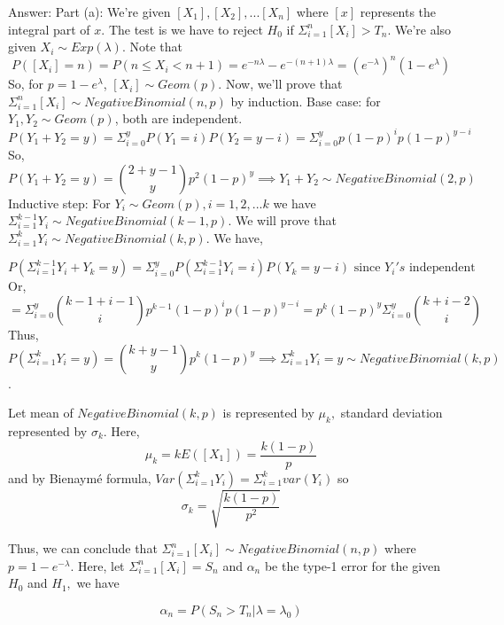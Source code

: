\documentclass[12pt, oneside]{article}
\begin{document}
\begin{enumerate}
Answer:
\newline Part (a): We're given $[X_1],[X_2],...[X_n]$ where $[x]$ represents the integral part of $x$. The test is we have to reject $H_0$ if $\Sigma_{i=1}^{n} [X_i] > T_n$. 
\newline We're also given $X_i \sim Exp(\lambda)$. Note that $$P([X_i] = n) = P(n \le X_i < n+1) = e^{-n\lambda} - e^{-(n+1)\lambda} = (e^{-\lambda})^n (1-e^{\lambda})$$
So, for $p = 1 - e^{\lambda}$, $[X_i] \sim Geom(p)$. Now, we'll prove that $\Sigma_{i=1}^{n} [X_i] \sim NegativeBinomial(n,p)$ by induction.
\newline Base case: for $Y_1,Y_2 \sim Geom(p)$, both are independent. 
$$P(Y_1 + Y_2 = y) = \Sigma_{i=0}^{y} P(Y_1 = i) P(Y_2 = y-i) = \Sigma_{i=0}^{y} p(1-p)^i p (1-p)^{y-i}$$
So, 
$$P(Y_1 + Y_2 = y) = {2+y-1 \choose y} p^2 (1-p)^{y} \implies Y_1 + Y_2 \sim NegativeBinomial(2,p)$$
\newline Inductive step: For $Y_i \sim Geom(p), i=1,2,...k$ we have $\Sigma_{i=1}^{k-1} Y_i \sim NegativeBinomial(k-1,p)$. We will prove that $\Sigma_{i=1}^{k} Y_i \sim NegativeBinomial(k,p)$. We have,

$$P(\Sigma_{i=1}^{k-1} Y_i + Y_{k} = y) = \Sigma_{i=0}^{y} P(\Sigma_{i=1}^{k-1} Y_i = i) P(Y_k = y-i) \text{   since $Y_i's$ independent}$$
Or,
$$ = \Sigma_{i=0}^{y} {k-1+i-1 \choose i} p^{k-1} (1-p)^i p (1-p)^{y-i} = p^k (1-p)^y \Sigma_{i=0}^{y} {k+i-2 \choose i}$$
Thus,
$$P(\Sigma_{i=1}^{k} Y_i = y) = {k+y-1 \choose y} p^k (1-p)^y \implies \Sigma_{i=1}^{k} Y_i = y \sim NegativeBinomial(k,p)$$. 

Let mean of $NegativeBinomial(k,p)$ is represented by $\mu_k,$ standard deviation represented by $\sigma_k$. Here,
$$\mu_k = k E([X_1]) = \dfrac{k(1-p)}{p}$$ and by Bienaymé formula, 
$Var(\Sigma_{i=1}^{k} Y_i) = \Sigma_{i=1}^{k} var(Y_i)$ so
$$\sigma_k = \sqrt{\dfrac{k(1-p)}{p^2}}$$
 
Thus, we can conclude that $\Sigma_{i=1}^{n} [X_i] \sim NegativeBinomial(n,p)$ where $p = 1 - e^{-\lambda}$. Here, let $\Sigma_{i=1}^{n} [X_i] = S_n$ and $\alpha_n$ be the type-1 error for the given $H_0$ and $H_1,$ we have

$$\alpha_n = P(S_n > T_n | \lambda = \lambda_0)$$


\end{enumerate}
\end{document}
